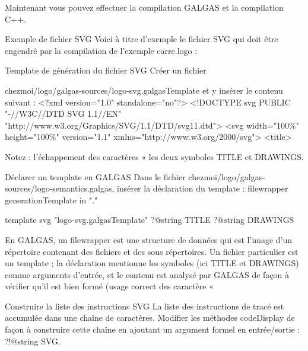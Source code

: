 Maintenant vous pouvez effectuer la compilation GALGAS et la compilation C++.

Exemple de fichier SVG
Voici à titre d'exemple le fichier SVG qui doit être engendré par la compilation de l'exemple carre.logo :


Template de génération du fichier SVG
Créer un fichier


chezmoi/logo/galgas-sources/logo-svg.galgasTemplate 
et y insérer le contenu suivant :
<?xml version="1.0" standalone="no"?>
<!DOCTYPE svg PUBLIC "-//W3C//DTD SVG 1.1//EN" "http://www.w3.org/Graphics/SVG/1.1/DTD/svg11.dtd">
<svg width="100\%" height="100\%" version="1.1" xmlns="http://www.w3.org/2000/svg">
<title>%

Notez :
l'échappement des caractères « %
les deux symboles TITLE et DRAWINGS.

Déclarer un template en GALGAS
Dans le fichier chezmoi/logo/galgas-sources/logo-semantics.galgas, insérer la déclaration du template :
filewrapper generationTemplate in "." {
} {
} {

template svg "logo-svg.galgasTemplate"
?@string TITLE
?@string DRAWINGS
}

En GALGAS, un filewrapper est une structure de données qui est l'image d'un répertoire contenant des fichiers et des sous répertoires. Un fichier particulier est un template ; la déclaration mentionne les symboles (ici TITLE et DRAWINGS) comme arguments d'entrée, et le contenu est analysé par GALGAS de façon à vérifier qu'il est bien formé (usage correct des caractère « 


Construire la liste des instructions SVG
La liste des instructions de tracé est accumulée dans une chaîne de caractères. Modifier les méthodes codeDisplay de façon à construire cette chaîne en ajoutant un argument formel en entrée/sortie : ?!@string SVG.

